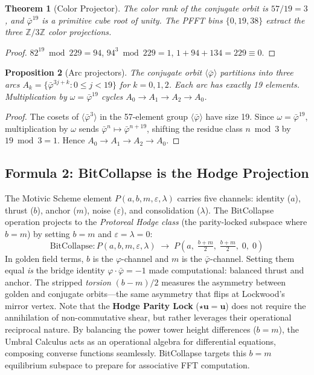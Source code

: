 \documentclass[12pt,oneside]{article}
\theoremstyle{principia}
\newtheorem{theorem}{Theorem}[section]
\newtheorem{proposition}[theorem]{Proposition}
\theoremstyle{definition}
\theoremstyle{remark}
\providecommand{\ZZ}{\mathbb{Z}}
\providecommand{\vp}{\varphi}
\providecommand{\vpbar}{\bar{\varphi}}
\begin{document}
\begin{theorem}[Color Projector]\label{thm:color_proj}
The color rank of the conjugate orbit is $57 / 19 = 3$, and $\vpbar^{19}$ is a primitive cube root of unity. The PFFT bins $\{0, 19, 38\}$ extract the three $\ZZ/3\ZZ$ color projections.
\end{theorem}

\begin{proof}
$82^{19} \bmod 229 = 94$, $94^3 \bmod 229 = 1$, $1 + 94 + 134 = 229 \equiv 0$. \qedhere
\end{proof}

\begin{proposition}[Arc projectors]\label{prop:arcs}
The conjugate orbit $\langle \vpbar \rangle$ partitions into three arcs $A_k = \{\vpbar^{3j+k} : 0 \leq j < 19\}$ for $k = 0, 1, 2$. Each arc has exactly 19 elements. Multiplication by $\omega = \vpbar^{19}$ cycles $A_0 \to A_1 \to A_2 \to A_0$.
\end{proposition}

\begin{proof}
The cosets of $\langle \vpbar^3 \rangle$ in the 57-element group $\langle \vpbar \rangle$ have size 19. Since $\omega = \vpbar^{19}$, multiplication by $\omega$ sends $\vpbar^n \mapsto \vpbar^{n+19}$, shifting the residue class $n \bmod 3$ by $19 \bmod 3 = 1$. Hence $A_0 \to A_1 \to A_2 \to A_0$. \qedhere
\end{proof}

\subsection{Formula 2: BitCollapse is the Hodge Projection}

The Motivic Scheme element $P(a, b, m, \varepsilon, \lambda)$ carries five channels: identity ($a$), thrust ($b$), anchor ($m$), noise ($\varepsilon$), and consolidation ($\lambda$). The BitCollapse operation projects to the \emph{Protoreal Hodge class} (the parity-locked subspace where $b = m$) by setting $b = m$ and $\varepsilon = \lambda = 0$:
\[
\mathrm{BitCollapse}: P(a, b, m, \varepsilon, \lambda) \;\longrightarrow\; P\!\left(a,\; \tfrac{b+m}{2},\; \tfrac{b+m}{2},\; 0,\; 0\right)
\]
In golden field terms, $b$ is the $\vp$-channel and $m$ is the $\vpbar$-channel. Setting them equal \emph{is} the bridge identity $\vp \cdot \vpbar = -1$ made computational: balanced thrust and anchor. The stripped \emph{torsion} $(b - m)/2$ measures the asymmetry between golden and conjugate orbits---the same asymmetry that flips at Lockwood's mirror vertex. Note that the \textbf{Hodge Parity Lock} ($\star \mathbf{u} = \mathbf{u}$) does not require the annihilation of non-commutative shear, but rather leverages their operational reciprocal nature. By balancing the power tower height differences ($b = m$), the Umbral Calculus acts as an operational algebra for differential equations, composing converse functions seamlessly. BitCollapse targets this $b=m$ equilibrium subspace to prepare for associative FFT computation.
\end{document}
